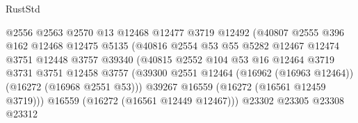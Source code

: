 \begin{lexlean}{RustStd}
\begin{coremodule}
                                        @2556
                                        @2563
                                        @2570
                                        @13
                                        @12468
                                        @12477
                                        @3719
                                        @12492
                                        (@40807
                                          @2555
                                          @396
                                          @162
                                          @12468
                                          @12475
                                          @5135
                                          (@40816
                                            @2554
                                            @53
                                            @55
                                            @5282
                                            @12467
                                            @12474
                                            @3751
                                            @12448
                                            @3757
                                            @39340
                                            (@40815
                                              @2552
                                              @104
                                              @53
                                              @16
                                              @12464
                                              @3719
                                              @3731
                                              @3751
                                              @12458
                                              @3757
                                              (@39300
                                                @2551
                                                @12464
                                                (@16962 (@16963 @12464))
                                                (@16272 (@16968 @2551 @53)))
                                              @39267
                                              @16559
                                              (@16272 (@16561 @12459 @3719)))
                                            @16559
                                            (@16272 (@16561 @12449 @12467)))
                                          @23302
                                          @23305
                                          @23308
                                          @23312

\end{coremodule}
\end{lexlean}
